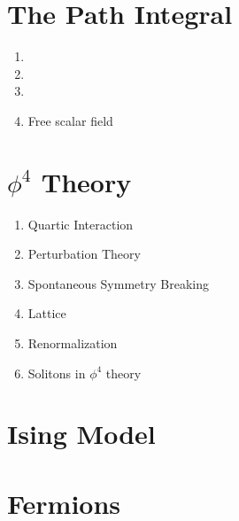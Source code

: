 \documentclass[12pt]{article}
\begin{document}
\section{The Path Integral}







\begin{enumerate}
\item 
\item 
\item 
\item Free scalar field
\end{enumerate}


\section{{\boldmath $\phi^4$} Theory}

\begin{enumerate}
\item Quartic Interaction
\item Perturbation Theory
\item Spontaneous Symmetry Breaking
\item Lattice
\item Renormalization
\item Solitons in $\phi^4$ theory
\end{enumerate}



\section{Ising Model}


\section{Fermions}



 
\renewcommand{\refname}{Bibliography}

\end{document}
